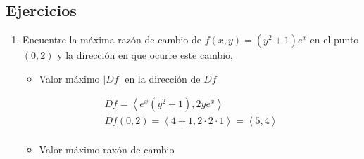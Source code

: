 \subsection{Ejercicios}
\begin{enumerate}
    \item Encuentre la máxima razón de cambio de $f(x,y)=(y^2+1)e^x$ en el punto $(0,2)$ y la dirección en que ocurre este cambio, 
        \begin{itemize}
            \item Valor máximo $|Df|$ en la dirección de $Df$
        \end{itemize}
        \begin{center}
           \begin{align*}
               Df = \left\langle e^x(y^2+1), 2ye^x \right\rangle \\ 
               Df (0,2) = \left\langle 4+1,2 \cdot 2 \cdot 1 \right\rangle = \left\langle 5,4 \right\rangle  \\ 
           \end{align*}
        \end{center}
        \begin{itemize}
            \item Valor máximo raxón de cambio 
        \end{itemize}
\end{enumerate}


